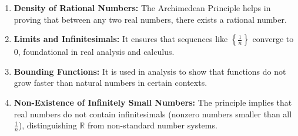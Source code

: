 \begin{enumerate}
	\item \textbf{Density of Rational Numbers:} The Archimedean Principle helps in proving that between any two real numbers, there exists a rational number.

	\item \textbf{Limits and Infinitesimals:} It ensures that sequences like \( \left\{ \frac{1}{n} \right\} \) converge to 0, foundational in real analysis and calculus.

	\item \textbf{Bounding Functions:} It is used in analysis to show that functions do not grow faster than natural numbers in certain contexts.

	\item \textbf{Non-Existence of Infinitely Small Numbers:} The principle implies that real numbers do not contain infinitesimals (nonzero numbers smaller than all \( \frac{1}{n} \)), distinguishing \( \mathbb{R} \) from non-standard number systems.
\end{enumerate}

